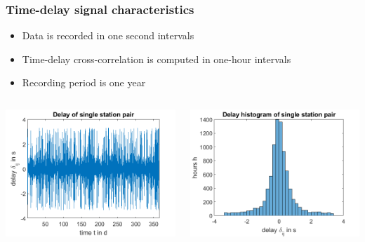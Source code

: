 \documentclass{beamer}
\begin{document}
\begin{frame}
\frametitle{Time-delay signal characteristics}
\begin{itemize}
\item Data is recorded in one second intervals
\item Time-delay cross-correlation is computed in one-hour intervals
\item Recording period is one year
\end{itemize}

\begin{columns}
\includegraphics[width=\textwidth]{delayevolutionovertimeforonestation2_presentation.png}

\includegraphics[width=\textwidth]{delayevolutionovertimeforonestation_presentation.png}
\end{columns}
\end{frame}
\end{document}
